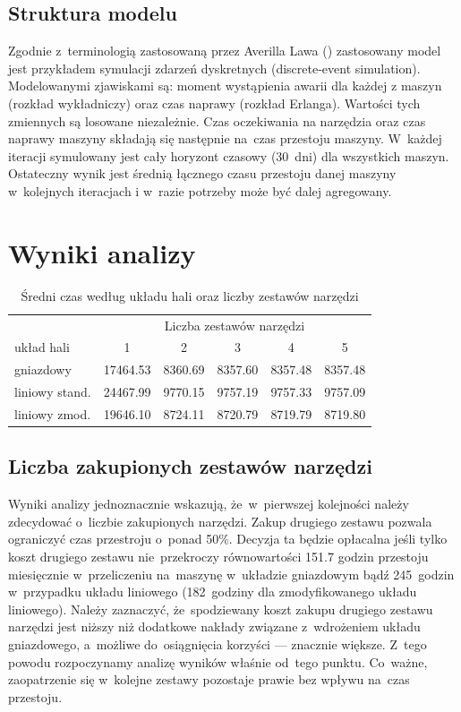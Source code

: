 \documentclass[12pt, a4paper, oneside]{mwart} %
\begin{document}
\subsection{Struktura modelu}
Zgodnie z~terminologią zastosowaną przez Averilla Lawa (\cite{law}) zastosowany model jest przykładem symulacji zdarzeń dyskretnych (discrete-event simulation). Modelowanymi zjawiskami są: moment wystąpienia awarii dla każdej z maszyn (rozkład wykładniczy) oraz czas naprawy (rozkład Erlanga). Wartości tych zmiennych są losowane niezależnie. Czas oczekiwania na narzędzia oraz czas naprawy maszyny składają się następnie na~czas przestoju maszyny. W~każdej iteracji symulowany jest cały horyzont czasowy (30~dni) dla wszystkich maszyn. Ostateczny wynik jest średnią łącznego czasu przestoju danej maszyny w~kolejnych iteracjach i w~razie potrzeby może być dalej agregowany.

\section{Wyniki analizy}

\begin{table}[ht]
\centering
\label{sr_czas_przestoju}
\caption{Średni czas według układu hali oraz liczby zestawów narzędzi}
\begin{tabular}{l|c|c|c|c|c}
& \multicolumn{5}{|c}{Liczba zestawów narzędzi}\\
układ hali &        1 &       2 &       3 &       4 &       5 \\ \hline
gniazdowy  & 17464.53 & 8360.69 & 8357.60 & 8357.48 & 8357.48 \\
liniowy stand. & 24467.99 & 9770.15 & 9757.19 & 9757.33 & 9757.09 \\
liniowy zmod. & 19646.10 & 8724.11 & 8720.79 & 8719.79 & 8719.80 \\
\end{tabular}
\end{table}

\subsection{Liczba zakupionych zestawów narzędzi}
Wyniki analizy jednoznacznie wskazują, że~w~pierwszej kolejności należy zdecydować o~liczbie zakupionych narzędzi. Zakup drugiego zestawu pozwala ograniczyć czas przestroju o~ponad 50\%. Decyzja ta będzie opłacalna jeśli tylko koszt drugiego zestawu nie~przekroczy równowartości 151.7 godzin przestoju miesięcznie w~przeliczeniu na~maszynę w~układzie gniazdowym bądź 245~godzin w~przypadku układu liniowego (182~godziny dla zmodyfikowanego układu liniowego). Należy zaznaczyć, że~spodziewany koszt zakupu drugiego zestawu narzędzi jest niższy niż dodatkowe nakłady związane z~wdrożeniem układu gniazdowego, a~możliwe do~osiągnięcia korzyści --- znacznie większe. Z~tego powodu rozpoczynamy analizę wyników właśnie od~tego punktu. Co~ważne, zaopatrzenie się w~kolejne zestawy pozostaje prawie bez wpływu na~czas przestoju.
\end{document}
